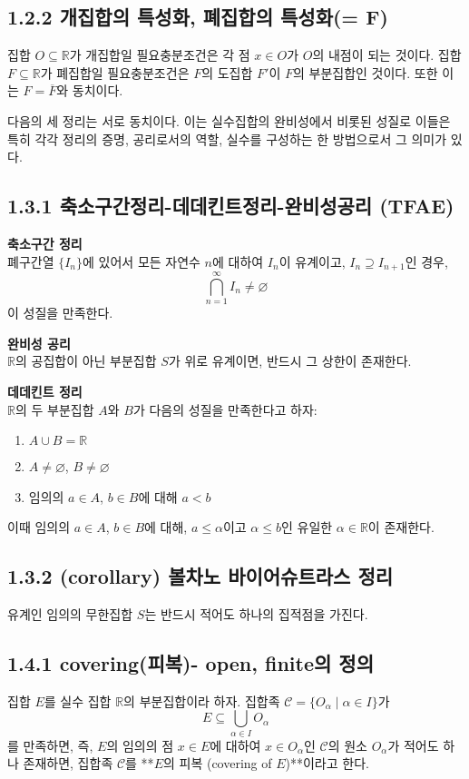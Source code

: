 \documentclass{article}
\begin{document}
\subsection*{\textmd{1.2.2 개집합의 특성화, 폐집합의 특성화(= F)}}
집합 $O \subseteq \mathbb{R}$가 개집합일 필요충분조건은 각 점 $x \in O$가 $O$의 내점이 되는 것이다.
집합 $F \subseteq \mathbb{R}$가 폐집합일 필요충분조건은 $F$의 도집합 $F'$이 $F$의 부분집합인 것이다. 또한 이는 $F = \overline{F}$와 동치이다.


\bigskip
다음의 세 정리는 서로 동치이다. 이는 실수집합의 완비성에서 비롯된 성질로 이들은 특히 각각 정리의 증명, 공리로서의 역할, 실수를 구성하는 한 방법으로서 그 의미가 있다.
\subsection*{\textmd{1.3.1 축소구간정리-데데킨트정리-완비성공리 (TFAE)}}
\textbf{축소구간 정리} \\
폐구간열 $\{I_n\}$에 있어서 모든 자연수 $n$에 대하여 $I_n$이 유계이고, $I_n \supseteq I_{n+1}$인 경우, 
$$ \bigcap_{n=1}^{\infty} I_n \neq \varnothing $$ 
이 성질을 만족한다.

\textbf{완비성 공리} \\
$\mathbb{R}$의 공집합이 아닌 부분집합 $S$가 위로 유계이면, 반드시 그 상한이 존재한다.

\bigskip
\textbf{데데킨트 정리} \\
$\mathbb{R}$의 두 부분집합 $A$와 $B$가 다음의 성질을 만족한다고 하자:
\begin{enumerate}
    \item $A \cup B = \mathbb{R}$
    \item $A \neq \varnothing$, $B \neq \varnothing$
    \item 임의의 $a \in A$, $b \in B$에 대해 $a < b$
\end{enumerate}
이때 임의의 $a \in A$, $b \in B$에 대해, $a \leq \alpha$이고 $\alpha \leq b$인 유일한 $\alpha \in \mathbb{R}$이 존재한다.




\subsection*{\textmd{1.3.2 (corollary) 볼차노 바이어슈트라스 정리}}
유계인 임의의 무한집합 $S$는 반드시 적어도 하나의 집적점을 가진다.




\subsection*{\textmd{1.4.1 covering(피복)- open, finite의 정의}}
집합 $E$를 실수 집합 $\mathbb{R}$의 부분집합이라 하자.  
집합족 $\mathscr{C} = \{ O_\alpha \mid \alpha \in I \}$가  
\[
E \subseteq \bigcup_{\alpha \in I} O_\alpha
\]
를 만족하면, 즉, $E$의 임의의 점 $x \in E$에 대하여 $x \in O_\alpha$인 $\mathscr{C}$의 원소 $O_\alpha$가 적어도 하나 존재하면,  
집합족 $\mathscr{C}$를 **$E$의 피복 (covering of $E$)**이라고 한다.
\end{document}
